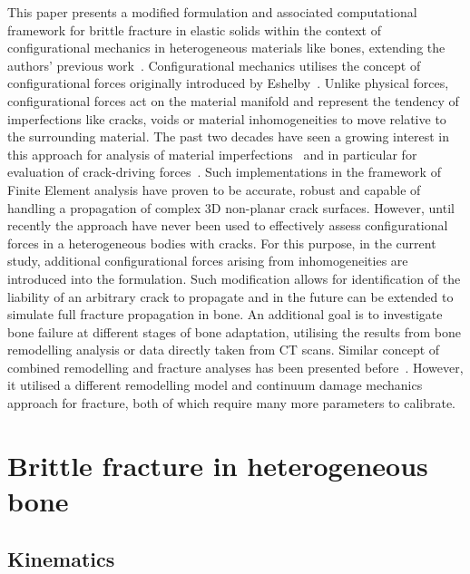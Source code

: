 \documentclass[11pt]{acmeArticle}
\numberwithin{equation}{section}
\begin{document}
This paper presents a modified formulation and associated computational framework for brittle fracture in elastic solids within the context of configurational mechanics in heterogeneous materials like bones, extending the authors' previous work~\citep{kaczmarczyk2017energy}. 
Configurational mechanics utilises the concept of configurational forces originally introduced by Eshelby~\citep{eshelby1951force}. 
Unlike physical forces, configurational forces act on the material manifold and represent the tendency of imperfections like cracks, voids or material inhomogeneities to move relative to the surrounding material. 
The past two decades have seen a growing interest in this approach for analysis of material imperfections~\citep{maugin2016configurational} and in particular for evaluation of crack-driving forces~\citep{steinmann2001application, ozencc2016configurational, kaczmarczyk2017energy}. 
Such implementations in the framework of Finite Element analysis have proven to be accurate, robust and capable of handling a propagation of complex 3D non-planar crack surfaces. However, until recently the approach have never been used to effectively assess configurational forces in a heterogeneous bodies with cracks. 
For this purpose, in the current study, additional configurational forces arising from inhomogeneities are introduced into the formulation. Such modification allows for identification of the liability of an arbitrary crack to propagate and in the future can be extended to simulate full fracture propagation in bone. 
An additional goal is to investigate bone failure at different stages of bone adaptation, utilising the results from bone remodelling analysis or data directly taken from CT scans. 
Similar concept of combined remodelling and fracture analyses has been presented before~\citep{hambli2013integrated}. 
However, it utilised a different remodelling model and continuum damage mechanics approach for fracture, both of which require many more parameters to calibrate. 

\section{Brittle fracture in heterogeneous bone}\label{sec:release_energy}

 \subsection{Kinematics}\label{sec:Kinematics}
\end{document}
